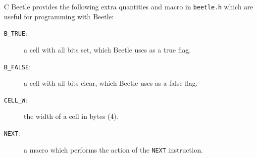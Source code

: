 \documentclass{article}
\begin{document}
C Beetle provides the following extra quantities and macro in {\tt beetle.h}
which are useful for programming with Beetle:

\begin{description}
\item[{\tt B\_TRUE}:] a cell with all bits set, which Beetle uses as a true
flag.
\item[{\tt B\_FALSE}:] a cell with all bits clear, which Beetle uses as a
false flag.
\item[{\tt CELL\_W}:] the width of a cell in bytes (4).
\item[{\tt NEXT}:] a macro which performs the action of the {\tt NEXT}
instruction.
\end{description}




\end{document}
